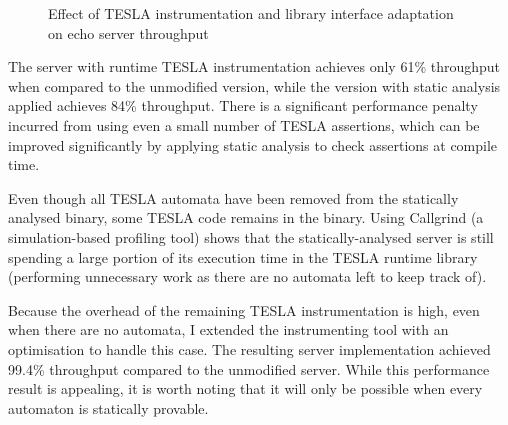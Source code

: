 \begin{figure}[ht]
  \centering
  \caption{Effect of TESLA instrumentation and library interface adaptation on
  echo server throughput}
  \label{fig:echo-bench}
\end{figure}

The server with runtime TESLA instrumentation achieves only 61\% throughput when
compared to the unmodified version, while the version with static analysis
applied achieves 84\% throughput. There is a significant performance penalty
incurred from using even a small number of TESLA assertions, which can be
improved significantly by applying static analysis to check assertions at
compile time.

Even though all TESLA automata have been removed from the statically analysed
binary, some TESLA code remains in the binary. Using Callgrind
\cite{weidendorfer_tool_2004} (a simulation-based profiling tool) shows that the
statically-analysed server is still spending a large portion of its execution
time in the TESLA runtime library (performing unnecessary work as there are no
automata left to keep track of).

Because the overhead of the remaining TESLA instrumentation is high, even when
there are no automata, I extended the instrumenting tool with an optimisation to
handle this case. The resulting server implementation achieved 99.4\% throughput
compared to the unmodified server. While this performance result is appealing,
it is worth noting that it will only be possible when every automaton is
statically provable.

